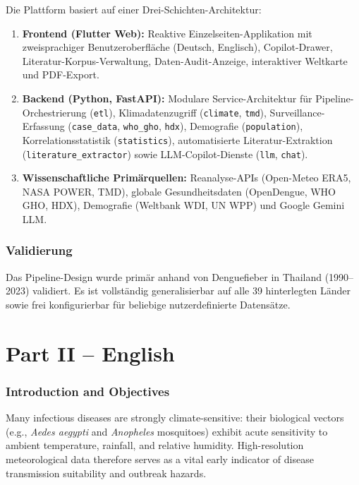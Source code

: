 \documentclass[11pt,a4paper]{article}
\begin{document}
Die Plattform basiert auf einer Drei-Schichten-Architektur:
\begin{enumerate}[label=(\arabic*)]\sloppy
  \item \textbf{Frontend (Flutter Web):} Reaktive Einzelseiten-Applikation mit zweisprachiger Benutzeroberfl\"ache (Deutsch, Englisch), Copilot-Drawer, Literatur-Korpus-Verwaltung, Daten-Audit-Anzeige, interaktiver Weltkarte und PDF-Export.
  \item \textbf{Backend (Python, FastAPI):} Modulare Service-Architektur f\"ur Pipeline-Orchestrierung (\texttt{etl}), Klimadatenzugriff (\texttt{climate}, \texttt{tmd}), Surveillance-Erfassung (\texttt{case\_data}, \texttt{who\_gho}, \texttt{hdx}), Demografie (\texttt{population}), Korrelationsstatistik (\texttt{statistics}), automatisierte Literatur-Extraktion (\texttt{literature\_extractor}) sowie LLM-Copilot-Dienste (\texttt{llm}, \texttt{chat}).
  \item \textbf{Wissenschaftliche Prim\"arquellen:} Reanalyse-APIs (Open-Meteo ERA5, NASA POWER, TMD), globale Gesundheitsdaten (OpenDengue, WHO GHO, HDX), Demografie (Weltbank WDI, UN WPP) und Google Gemini LLM.
\end{enumerate}

\section{Validierung}

Das Pipeline-Design wurde prim\"ar anhand von Denguefieber in Thailand (1990--2023)
validiert. Es ist vollst\"andig generalisierbar auf alle 39 hinterlegten L\"ander
sowie frei konfigurierbar f\"ur beliebige nutzerdefinierte Datens\"atze.

\newpage
\part*{Part II -- English}

\section{Introduction and Objectives}

Many infectious diseases are strongly climate-sensitive: their biological vectors
(e.g., \emph{Aedes aegypti} and \emph{Anopheles} mosquitoes) exhibit acute sensitivity
to ambient temperature, rainfall, and relative humidity. High-resolution meteorological
data therefore serves as a vital early indicator of disease transmission suitability
and outbreak hazards.
\end{document}
